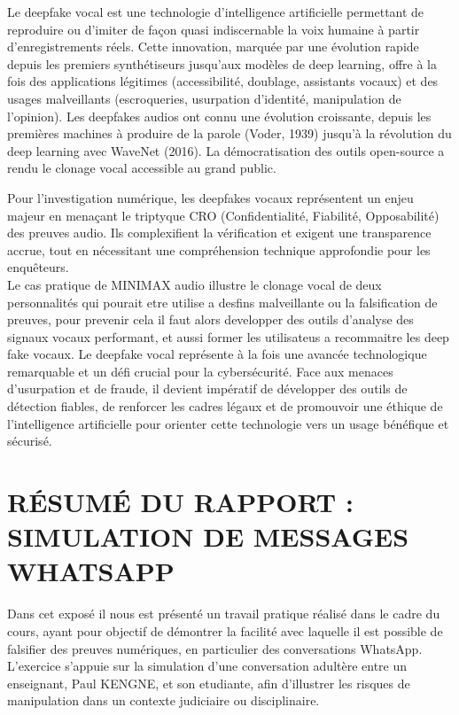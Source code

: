 \documentclass[12pt,a4paper]{article}
\begin{document}
{		Le deepfake vocal est une technologie d'intelligence artificielle permettant de reproduire ou d'imiter de façon quasi indiscernable la voix humaine à partir d'enregistrements réels. Cette innovation, marquée par une évolution rapide depuis les premiers synthétiseurs jusqu'aux modèles de deep learning, offre à la fois des applications légitimes (accessibilité, doublage, assistants vocaux) et des usages malveillants (escroqueries, usurpation d'identité, manipulation de l'opinion). Les deepfakes audios ont connu une évolution croissante, depuis les premières machines à produire de la parole (Voder, 1939) jusqu'à la révolution du deep learning avec WaveNet (2016). La démocratisation des outils open-source a rendu le clonage vocal accessible au grand public.
		
		Pour l'investigation numérique, les deepfakes vocaux représentent un enjeu majeur en menaçant le triptyque CRO (Confidentialité, Fiabilité, Opposabilité) des preuves audio. Ils complexifient la vérification et exigent une transparence accrue, tout en nécessitant une compréhension technique approfondie pour les enquêteurs.\\[1 cm]
		
		Le cas pratique de MINIMAX audio illustre le clonage vocal de deux personnalités qui pourait  etre utilise a desfins malveillante ou la falsification de preuves, pour prevenir cela il faut alors developper des outils d'analyse des signaux vocaux performant, et aussi former les utilisateus a recommaitre les deep fake vocaux. Le deepfake vocal représente à la fois une avancée technologique remarquable et un défi crucial pour la cybersécurité. Face aux menaces d'usurpation et de fraude, il devient impératif de développer des outils de détection fiables, de renforcer les cadres légaux et de promouvoir une éthique de l'intelligence artificielle pour orienter cette technologie vers un usage bénéfique et sécurisé.\\[2.5 cm]
		
		\section*{RÉSUMÉ DU RAPPORT : SIMULATION DE MESSAGES WHATSAPP }
		Dans cet exposé il nous est présenté un travail pratique réalisé dans le cadre du cours, ayant pour objectif de démontrer la facilité avec laquelle il est possible de falsifier des preuves numériques, en particulier des conversations WhatsApp. L’exercice s’appuie sur la simulation d’une conversation adultère entre un enseignant, Paul KENGNE, et son etudiante, afin d’illustrer les risques de manipulation dans un contexte judiciaire ou disciplinaire.
		
}
\end{document}
